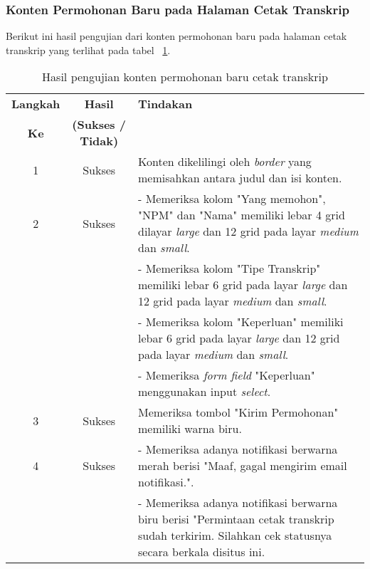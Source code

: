 \subsubsection{Konten Permohonan Baru pada Halaman Cetak Transkrip}
Berikut ini hasil pengujian dari konten permohonan baru pada halaman cetak transkrip yang terlihat pada tabel ~\ref{hasil:PermohonanBaru}.
\begin{table}[H]
	\centering 
	\caption{Hasil pengujian konten permohonan baru cetak transkrip}
	\label{hasil:PermohonanBaru}
	\begin{tabular}{|c| c| p{}|}
		\toprule
		\textbf{Langkah} & \textbf{Hasil} & \textbf{Tindakan}\\
		\textbf{Ke} & \textbf{(Sukses / Tidak)} &\\
		\midrule
		1&Sukses&Konten dikelilingi oleh \textit{border} yang memisahkan antara judul dan isi konten.\\
		\hline
		2&Sukses& - Memeriksa kolom "Yang memohon", "NPM" dan "Nama" memiliki lebar 4 grid dilayar \textit{large} dan 12 grid pada layar \textit{medium} dan \textit{small}.\\		
		&& - Memeriksa kolom "Tipe Transkrip" memiliki lebar 6 grid pada layar \textit{large} dan 12 grid pada layar \textit{medium} dan \textit{small}.\\
		&& - Memeriksa kolom "Keperluan" memiliki lebar 6 grid pada layar \textit{large} dan 12 grid pada layar \textit{medium} dan \textit{small}.\\
		&& - Memeriksa \textit{form field} "Keperluan" menggunakan input \textit{select}.\\
		\hline
		3&Sukses&Memeriksa tombol "Kirim Permohonan" memiliki warna biru.\\
		\hline
		4&Sukses& - Memeriksa adanya notifikasi berwarna merah berisi "Maaf, gagal mengirim email notifikasi.".\\
		&& - Memeriksa adanya notifikasi berwarna biru  berisi "Permintaan cetak transkrip sudah terkirim. Silahkan cek statusnya secara berkala disitus ini.\\		
		\bottomrule		
	\end{tabular} 
\end{table}


